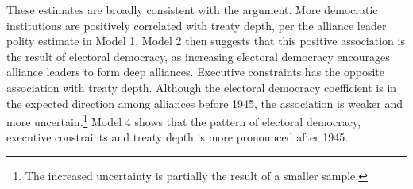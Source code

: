 \documentclass[12pt]{article}
\begin{document}
These estimates are broadly consistent with the argument. 
More democratic institutions are positively correlated with treaty depth, per the alliance leader polity estimate in Model 1. 
Model 2 then suggests that this positive association is the result of electoral democracy, as increasing electoral democracy encourages alliance leaders to form deep alliances. 
Executive constraints has the opposite association with treaty depth. 
Although the electoral democracy coefficient is in the expected direction among alliances before 1945, the association is weaker and more uncertain.\footnote{The increased uncertainty is partially the result of a smaller sample.} 
Model 4 shows that the pattern of electoral democracy, executive constraints and treaty depth is more pronounced after 1945. 


\begin{table}[!htbp] \centering 
\end{table}
\end{document}
